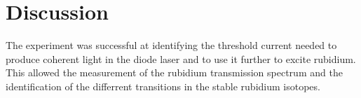\section{Discussion}
    The experiment was successful at identifying the
    threshold current needed to produce coherent light in the
    diode laser and to use it further to excite rubidium.
    This allowed the measurement of the rubidium transmission spectrum
    and the identification of the differrent transitions
    in the stable rubidium isotopes.